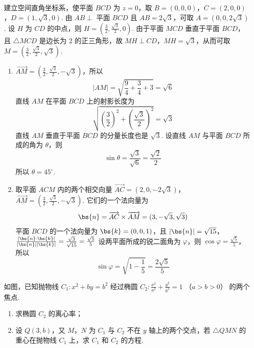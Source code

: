 \begin{solution}
建立空间直角坐标系，使平面 \(BCD\) 为 \(z=0\)，取 \(B=(0,0,0)\)，\(C=(2,0,0)\)，\(D=(1,\sqrt{3},0)\). 由 \(AB\perp\) 平面 \(BCD\) 且 \(AB=2\sqrt{3}\)，可取 \(A=(0,0,2\sqrt{3})\). 设 \(H\) 为 \(CD\) 的中点，则 \(H=\left(\frac{3}{2},\frac{\sqrt{3}}{2},0\right)\). 由于平面 \(MCD\) 垂直于平面 \(BCD\)，且 \(\triangle MCD\) 是边长为 \(2\) 的正三角形，故 \(MH\perp CD\)，\(MH=\sqrt{3}\)，从而可取 \(M=\left(\frac{3}{2},\frac{\sqrt{3}}{2},\sqrt{3}\right)\).

\begin{enumerate}
\item \(\overrightarrow{AM}=\left(\frac{3}{2},\frac{\sqrt{3}}{2},-\sqrt{3}\right)\)，所以
\[
|AM|=\sqrt{\frac{9}{4}+\frac{3}{4}+3}=\sqrt{6}
\]
直线 \(AM\) 在平面 \(BCD\) 上的射影长度为
\[
\sqrt{\left(\frac{3}{2}\right)^{2}+\left(\frac{\sqrt{3}}{2}\right)^{2}}=\sqrt{3}
\]
直线 \(AM\) 垂直于平面 \(BCD\) 的分量长度也是 \(\sqrt{3}\). 设直线 \(AM\) 与平面 \(BCD\) 所成的角为 \(\theta\)，则
\[
\sin\theta=\frac{\sqrt{3}}{\sqrt{6}}=\frac{\sqrt{2}}{2}
\]
所以 \(\theta=45^\circ\).

\item 取平面 \(ACM\) 内的两个相交向量 \(\overrightarrow{AC}=(2,0,-2\sqrt{3})\)，\(\overrightarrow{AM}=\left(\frac{3}{2},\frac{\sqrt{3}}{2},-\sqrt{3}\right)\). 它们的一个法向量为
\[
\bs{n}=\overrightarrow{AC}\times\overrightarrow{AM}=(3,-\sqrt{3},\sqrt{3})
\]
平面 \(BCD\) 的一个法向量为 \(\bs{k}=(0,0,1)\)，且
\(|\bs{n}|=\sqrt{15}\)，\(\frac{|\bs{n}\cdot\bs{k}|}{|\bs{n}||\bs{k}|}=\frac{\sqrt{3}}{\sqrt{15}}=\frac{\sqrt{5}}{5}\)
设两平面所成的锐二面角为 \(\varphi\)，则 \(\cos\varphi=\frac{\sqrt{5}}{5}\)，所以
\[
\sin\varphi=\sqrt{1-\frac{1}{5}}=\frac{2\sqrt{5}}{5}
\]
\end{enumerate}
\end{solution}

\begin{problem}
如图，已知抛物线 \(C_{1}: x^{2} + by = b^{2}\) 经过椭圆 \(C_{2}: \frac{x^{2}}{a^{2}} + \frac{y^{2}}{b^{2}} = 1\) （\(a > b > 0\)） 的两个焦点.
\begin{enumerate}
\item 求椭圆 \(C_2\) 的离心率；
\item 设 \(Q(3, b)\)，又 \(M\)，\(N\) 为 \(C_1\) 与 \(C_2\) 不在 \(y\) 轴上的两个交点，若 \(\triangle QMN\) 的重心在抛物线 \(C_1\) 上，求 \(C_1\) 和 \(C_2\) 的方程.
\end{enumerate}

\end{problem}

